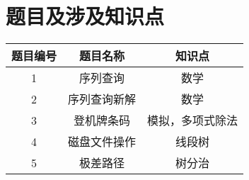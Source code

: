 \documentclass[cn,10pt,math=newtx,citestyle=gb7714-2015,bibstyle=gb7714-2015]{elegantbook}
\begin{document}
\section{题目及涉及知识点}

\begin{table}[htbp]
  \centering
  \begin{tabular}{ccc}
    \toprule
    题目编号 & 题目名称 & 知识点\\
    \midrule
    1 & 序列查询 & 数学\\
    2 & 序列查询新解 & 数学\\
    3 & 登机牌条码 & 模拟，多项式除法\\
    4 & 磁盘文件操作 & 线段树\\
    5 & 极差路径 & 树分治\\
    \bottomrule
  \end{tabular}
\end{table}










\end{document}

